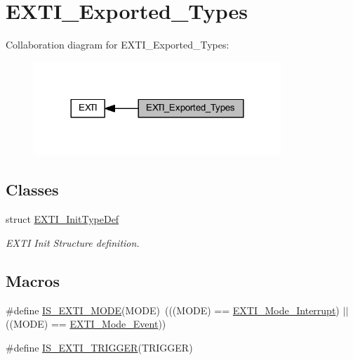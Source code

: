 \hypertarget{group___e_x_t_i___exported___types}{}\section{E\+X\+T\+I\+\_\+\+Exported\+\_\+\+Types}
\label{group___e_x_t_i___exported___types}
Collaboration diagram for E\+X\+T\+I\+\_\+\+Exported\+\_\+\+Types\+:
\nopagebreak
\begin{figure}[H]
\begin{center}
\leavevmode
\includegraphics[width=264pt]{group___e_x_t_i___exported___types}
\end{center}
\end{figure}
\subsection*{Classes}
\begin{DoxyCompactItemize}
\item 
struct \hyperlink{struct_e_x_t_i___init_type_def}{E\+X\+T\+I\+\_\+\+Init\+Type\+Def}
\begin{DoxyCompactList}\small\item\em E\+X\+TI Init Structure definition. \end{DoxyCompactList}\end{DoxyCompactItemize}
\subsection*{Macros}
\begin{DoxyCompactItemize}
\item 
\#define \hyperlink{group___e_x_t_i___exported___types_ga8429170f3320b90227f9f5b252c1c5eb}{I\+S\+\_\+\+E\+X\+T\+I\+\_\+\+M\+O\+DE}(M\+O\+DE)~(((M\+O\+DE) == \hyperlink{group___e_x_t_i___exported___types_ggad5e69af98dc0dfdf64417adc1cf57929a8c6ccdd7b1bc4872731306537e8c3b42}{E\+X\+T\+I\+\_\+\+Mode\+\_\+\+Interrupt}) $\vert$$\vert$ ((M\+O\+DE) == \hyperlink{group___e_x_t_i___exported___types_ggad5e69af98dc0dfdf64417adc1cf57929aa38ef186929ec74786df79877ea124a7}{E\+X\+T\+I\+\_\+\+Mode\+\_\+\+Event}))
\item 
\#define \hyperlink{group___e_x_t_i___exported___types_gaee95ec6288944a6245696896604e509e}{I\+S\+\_\+\+E\+X\+T\+I\+\_\+\+T\+R\+I\+G\+G\+ER}(T\+R\+I\+G\+G\+ER)
\end{DoxyCompactItemize}
